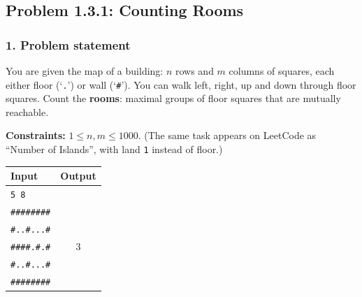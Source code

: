 \subsection{Problem 1.3.1: Counting Rooms}


\subsubsection*{1. Problem statement}

You are given the map of a building: $n$ rows and $m$ columns of squares, each either floor (`\texttt{.}') or wall (`\texttt{\#}'). You can walk left, right, up and down through floor squares. Count the \textbf{rooms}: maximal groups of floor squares that are mutually reachable.

\textbf{Constraints:} $1 \le n, m \le 1000$. \quad (The same task appears on LeetCode as ``Number of Islands'', with land \texttt{1} instead of floor.)

\begin{center}
\small
\begin{tabular}{@{}l c@{}}
\toprule
\textbf{Input} & \textbf{Output} \\
\midrule
\texttt{5 8} & \\
\texttt{\#\#\#\#\#\#\#\#} & \\
\texttt{\#..\#...\#} & \\
\texttt{\#\#\#\#.\#.\#} & 3 \\
\texttt{\#..\#...\#} & \\
\texttt{\#\#\#\#\#\#\#\#} & \\
\bottomrule
\end{tabular}
\end{center}

